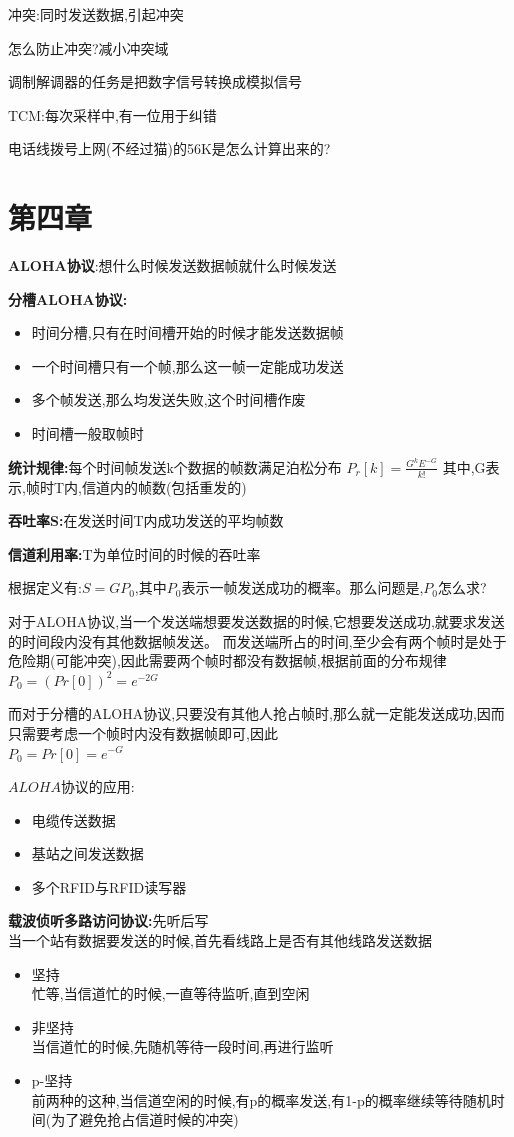 \documentclass[UTF8,a4paper]{ctexart}
\begin{document}
  冲突:同时发送数据,引起冲突

  怎么防止冲突?减小冲突域

  调制解调器的任务是把数字信号转换成模拟信号

  TCM:每次采样中,有一位用于纠错

  电话线拨号上网(不经过猫)的56K是怎么计算出来的?

\section{第四章}
\textbf{ALOHA协议}:想什么时候发送数据帧就什么时候发送

\textbf{分槽ALOHA协议:}
\begin{itemize}
  \item 时间分槽,只有在时间槽开始的时候才能发送数据帧
  \item 一个时间槽只有一个帧,那么这一帧一定能成功发送
  \item 多个帧发送,那么均发送失败,这个时间槽作废
  \item 时间槽一般取帧时
\end{itemize}

\textbf{统计规律:}每个时间帧发送k个数据的帧数满足泊松分布
$P_r[k] = \frac{G^kE^{-G}}{k!}$
其中,G表示,帧时T内,信道内的帧数(包括重发的)

\textbf{吞吐率S:}在发送时间T内成功发送的平均帧数

\textbf{信道利用率:}T为单位时间的时候的吞吐率

根据定义有:$S = GP_0$,其中$P_0$表示一帧发送成功的概率。那么问题是,$P_0$怎么求?

对于ALOHA协议,当一个发送端想要发送数据的时候,它想要发送成功,就要求发送的时间段内没有其他数据帧发送。
而发送端所占的时间,至少会有两个帧时是处于危险期(可能冲突),因此需要两个帧时都没有数据帧,根据前面的分布规律\\
$P_0 = (Pr[0])^2 = e^{-2G}$

而对于分槽的ALOHA协议,只要没有其他人抢占帧时,那么就一定能发送成功,因而只需要考虑一个帧时内没有数据帧即可,因此\\
$P_0 = Pr[0] = e^{-G}$

$ALOHA$协议的应用:
\begin{itemize}
  \item 电缆传送数据
  \item 基站之间发送数据
  \item 多个RFID与RFID读写器
\end{itemize}

\textbf{载波侦听多路访问协议:}先听后写\\
当一个站有数据要发送的时候,首先看线路上是否有其他线路发送数据
\begin{itemize}
  \item 坚持\\
  忙等,当信道忙的时候,一直等待监听,直到空闲
  \item 非坚持\\
  当信道忙的时候,先随机等待一段时间,再进行监听
  \item p-坚持\\
  前两种的这种,当信道空闲的时候,有p的概率发送,有1-p的概率继续等待随机时间(为了避免抢占信道时候的冲突)
\end{itemize}
\end{document}
